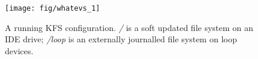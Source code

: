 \begin{figure}[tb]
  \centering
  \texttt{[image: fig/whatevs\_1]}
  \caption{A running KFS configuration. {\it/} is a soft updated
    file system on an IDE drive; {\it/loop} is an externally journalled
    file system on loop devices.}
  \label{fig:kfs-graph}
\end{figure}
